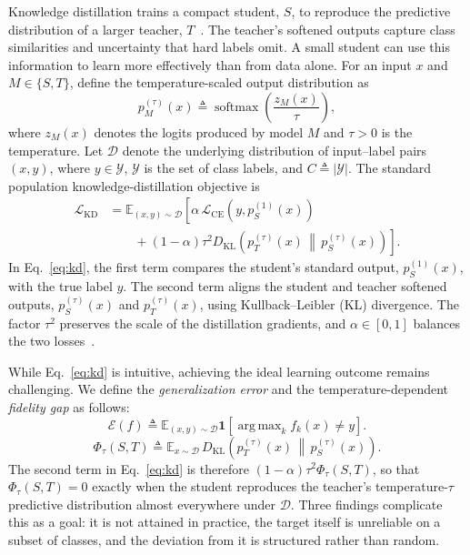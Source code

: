 \documentclass[review,number,sort&compress]{elsarticle}
\theoremstyle{definition}
\DeclareMathOperator*{\argmax}{arg\,max}
\begin{document}
Knowledge distillation trains a compact student, $S$, to reproduce the
predictive distribution of a larger teacher, $T$~\citep{gou2021knowledge}. The
teacher's softened outputs capture class similarities and uncertainty that hard
labels omit. A small student can use this information to learn more effectively
than from data alone. For an input $x$ and $M\in\{S,T\}$, define the
temperature-scaled output distribution as
\begin{equation}
\label{eq:softmax-temperature}
p_M^{(\tau)}(x) \triangleq
\operatorname{softmax}\!\left(\frac{z_M(x)}{\tau}\right),
\end{equation}
where $z_M(x)$ denotes the logits produced by model $M$ and $\tau>0$ is the
temperature. Let $\mathcal{D}$ denote the underlying distribution of
input--label pairs $(x,y)$, where $y\in\mathcal{Y}$, $\mathcal{Y}$ is the set
of class labels, and $C \triangleq \lvert\mathcal{Y}\rvert$. The standard
population knowledge-distillation objective is
\begin{equation}
\label{eq:kd}
\begin{aligned}
\mathcal{L}_{\mathrm{KD}}
&= \mathbb{E}_{(x,y)\sim\mathcal{D}}\!\left[
\alpha\,\mathcal{L}_{\mathrm{CE}}\!\left(y, p_S^{(1)}(x)\right)\right. \\
&\qquad\left. {}+ (1-\alpha)\tau^2 D_{\mathrm{KL}}\!\left(
p_T^{(\tau)}(x)\,\middle\|\,p_S^{(\tau)}(x)
\right)\right].
\end{aligned}
\end{equation}
In Eq.~\eqref{eq:kd}, the first term compares the student's standard output, $p_S^{(1)}(x)$, with
the true label $y$. The second term aligns the student and teacher softened
outputs, $p_S^{(\tau)}(x)$ and $p_T^{(\tau)}(x)$, using Kullback--Leibler (KL)
divergence. The factor $\tau^2$ preserves the scale of the distillation
gradients, and $\alpha\in[0,1]$ balances the two
losses~\citep{hinton2015distilling}.

While Eq.~\eqref{eq:kd} is intuitive, achieving the ideal learning outcome remains challenging. We define the \emph{generalization error} and the
temperature-dependent \emph{fidelity gap} as follows:
\begin{equation}
\label{eq:generalization-error}
\mathcal{E}(f) \triangleq \mathbb{E}_{(x,y)\sim\mathcal{D}}
\mathbf{1}\!\left[\argmax_k f_k(x) \neq y\right].
\end{equation}
\begin{equation}
\label{eq:fidelity-gap}
\Phi_{\tau}(S,T) \triangleq \mathbb{E}_{x\sim\mathcal{D}}\,
D_{\mathrm{KL}}\!\left(
p_T^{(\tau)}(x)\,\middle\|\,p_S^{(\tau)}(x)
\right).
\end{equation}
The second term in Eq.~\eqref{eq:kd} is therefore
$(1-\alpha)\tau^2\Phi_{\tau}(S,T)$, so that $\Phi_{\tau}(S,T)=0$ exactly when
the student reproduces the teacher's temperature-$\tau$ predictive
distribution almost everywhere under $\mathcal{D}$. Three findings complicate
this as a goal: it is not attained in practice, the target itself is
unreliable on a subset of classes, and the deviation from it is structured
rather than random.
\end{document}
